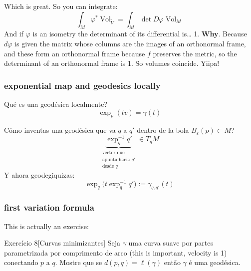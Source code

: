 Which is great. So you can integrate:
\[\int_M \varphi^*\operatorname{Vol}_{\widetilde{V}}=\int_M \det D\varphi \operatorname{Vol}_M\]
And if \(\varphi\) is an isometry the determinant of its differential is… 1. \textbf{Why}. Because \(d \varphi\) is given the matrix whose columns are the images of an orthonormal frame, and these form an orthonormal frame because \(f\) preserves the metric, so the determinant of an orthonormal frame is 1.  So volumes coincide. Yiipa!

\subsubsection{exponential map and geodesics locally}

Qué es una geodésica localmente?
\[\operatorname{exp}_p(tv)=\gamma(t)\]

Cómo inventas una geodésica que va \(q\) a \(q'\) dentro de la bola \(B_\varepsilon(p)\subset M\)?
\[\underbrace{\operatorname{exp}_q^{-1}q'}_{\substack{\text{vector que}  \\\text{apunta hacia \(q'\)}\\\text{desde \(q\)}   }} \in T_q M\]
Y ahora geodegiquizas:
\[\operatorname{exp}_q\Big(t\operatorname{exp}_q^{-1}q'\Big):=\gamma_{q,q'}(t)\]

\subsubsection{first variation formula}

This is actually an exercise:

\begin{thing4}{Exercício 8}[Curvas minimizantes]\label{exer:8}\leavevmode
Seja \(\gamma\) uma curva suave por partes parametrizada por comprimento de arco (this is important, velocity is 1) conectando \(p\) a \(q\). Mostre que se \(d(p,q)=\ell(\gamma)\) então \(\gamma\) é uma geodésica.
\end{thing4}


